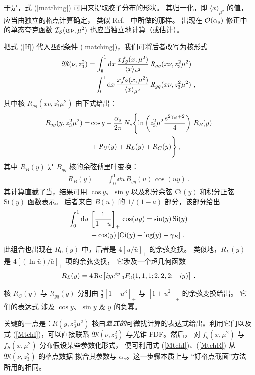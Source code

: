 于是，式 (\ref{matching}) 可用来提取胶子分布的形状。
其归一化，即 $\langle x \rangle_{\mu^2}$ 的值，应当由独立的格点计算确定，
类似 Ref.~\cite{Yang:2018bft} 中所做的那样。
出现在 ${\cal O} (\alpha_s)$ 修正中的单态夸克函数 ${\cal I}_S (w \nu, \mu^2)$
也应当独立地计算（或估计）。

把式 (\ref{If}) 代入匹配条件 (\ref{matching})，我们可将后者改写为核形式 \cite{Radyushkin:2019owq}
\begin{align}
{\mathfrak M}(\nu,z_3^2) & =
\int_{0}^1 \mathrm{d} x \,
\frac{x {f}_g (x,\mu^2) }{\langle x \rangle_{\mu^2}} \, R_{gg} (x \nu, z_3^2 \mu^2 ) \nonumber \\  &
+
\int_{0}^1 \mathrm{d} x \,
\frac{x {f}_S (x,\mu^2) }{\langle x \rangle_{\mu^2}} \, R_{gq} (x \nu, z_3^2 \mu^2 ) \
,
\label{MtchI}
\end{align}
其中核 $R_{gg} (x \nu, z_3^2 \mu^2 )$
由下式给出：
\begin{align}
R_{gg}(y, z_3^2 \mu^2) =& \cos y
- \frac{\alpha_s}{2\pi} \, N_c
\Biggl \{ \ln \left ( z_3^2 \mu^2\frac{e^{2\gamma_E+2}}{4} \right ) \,
R_B(y)\nonumber \\  & +R_U (y)
+R_L(y) +R_C(y) \Biggr \} \, ,
\label{MtchR}
\end{align}
其中 $R_B(y)$ 是
$B_{gg}$ 核的余弦傅里叶变换：
\begin{align}
R_B(y) =& \int_0^1 \dd u \, B_{gg} (u) \, \cos (u y) \ .
\label{RB}
\end{align}
其计算直截了当，结果可用 $\cos y$、$\sin y$
以及积分余弦 $\text{Ci}(y)$ 和积分正弦 $\text{Si}(y)$ 函数表示。
后者来自 $B(u)$ 的 $1/(1-u)$ 部分，该部分给出
\begin{align}
\int_0^1 \mathrm{d} u \, & \left[ \frac1{1-u} \right ]_+ \, \cos (u y) = \sin (y) \, \text{Si}(y) \nonumber \\  & +\cos (y)\,
[\text{Ci}(y)-\log (y)-\gamma_E ]
\ .
\label{RB0}
\end{align}
此组合也出现在 $R_U(y)$ 中，后者是 $4[u/\bar u]_+$ 的余弦变换。
类似地，$R_L(y)$ 是 \mbox{$4[(\ln \bar u)/\bar u]_+$} 项的余弦变换，
它涉及一个超几何函数
\begin{align}
R_L(y) =
4\, {\rm Re} \left [ i y e^{i y} \,
_3F_3(1,1,1;2,2,2;-i y) \right ] \, .
\label{MtchRL}
\end{align}

核 $R_C(y)$ 与 $R_{gq} (y)$ 分别由 $\frac23 \left [ 1-u^3
\right ]_+$ 与 $\left [ 1+\bar u^2\right]_+$ 的余弦变换给出。
它们的表达式
涉及 $\cos y$、$\sin y$ 及 $y$ 的负幂。

关键的一点是：$R(y, z_3^2 \mu^2)$ 核由{\it 显式的}可微扰计算的表达式给出。利用它们以及式 (\ref{MtchI})，可以直接联系
${\mathfrak M}(\nu,z_3^2)$ 与光锥
PDF。然后，
对 $f_g(x,\mu^2)$ 与 $f_S(x, \mu^2)$ 分布假设某些参数化形式，
便可利用式 (\ref{MtchI})、(\ref{MtchR}) 从 ${\mathfrak M}(\nu,z_3^2)$ 的格点数据
拟合其参数与 $\alpha_s$。这一步骤本质上与
``好格点截面''方法 \cite{Ma:2014jla,Ma:2017pxb} 所用的相同。

